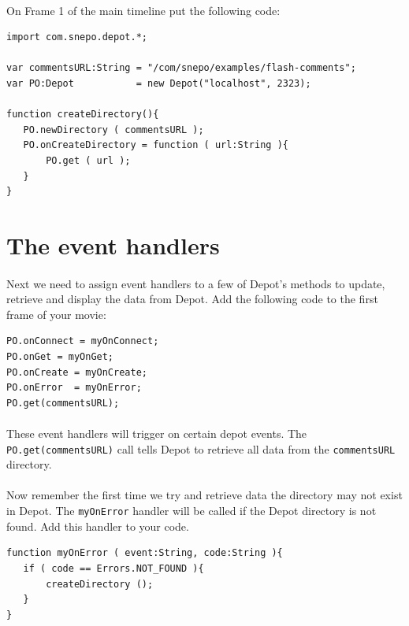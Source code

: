 \documentclass[12pt]{report}
\begin{document}
\paragraph{}
On Frame 1 of the main timeline put the following code:

\begin{Verbatim}[frame=single]
import com.snepo.depot.*;

var commentsURL:String = "/com/snepo/examples/flash-comments";
var PO:Depot           = new Depot("localhost", 2323);

function createDirectory(){
   PO.newDirectory ( commentsURL );
   PO.onCreateDirectory = function ( url:String ){
       PO.get ( url );
   }
} 
\end{Verbatim}

\section{The event handlers}

\paragraph{}
Next we need to assign event handlers to a few of Depot's methods to
update, retrieve and display the data from Depot. Add the following
code to the first frame of your movie:

\begin{Verbatim}[frame=single]
PO.onConnect = myOnConnect;
PO.onGet = myOnGet;
PO.onCreate = myOnCreate;
PO.onError  = myOnError;
PO.get(commentsURL);
\end{Verbatim}

\paragraph{}
These event handlers will trigger on certain depot events. The
\texttt{PO.get(commentsURL)} call tells Depot to retrieve all data
from the \texttt{commentsURL} directory.

\paragraph{}
Now remember the first time we try and retrieve data the directory 
may not exist in Depot. The \texttt{myOnError} handler will be called 
if the Depot directory is not found. Add this handler to your code.

\pagebreak

\begin{Verbatim}[frame=single]
function myOnError ( event:String, code:String ){
   if ( code == Errors.NOT_FOUND ){
       createDirectory ();
   }
}
\end{Verbatim}
\end{document}
